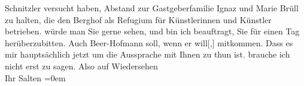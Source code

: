 \begin{ledgroupsized}[t]{13cm}
{{{                  Schnitzler versucht haben, Abstand zur Gastgeberfamilie Ignaz und Marie Brüll zu halten, die den Berghof als Refugium für Künstlerinnen und Künstler
                  betrieben.}}}\label{K_L03114-2h} würde man Sie gerne sehen, und bin ich beauftragt,
               Sie für einen Tag herüberzubitten. Auch Beer-Hofmann soll, wenn er will{[},{]} mitkommen. Dass es mir
               hauptsächlich jetzt um die Aussprache mit Ihnen zu thun ist\textcolor{gray}{,}
               brauche ich nicht erst zu sagen.\pend
           \pstart
           Also auf Wiedersehen {\\[\baselineskip]}Ihr \spacefill\mbox{Salten}\pend
           \leftskip=0em{}
         
         \endnumbering{}\end{ledgroupsized}  \newcommand{\dateiname}{L03114}\newcommand{\titel}{Felix Salten an Arthur Schnitzler, [25.? 8. 1892]}\newcommand{\editorInnen}{Martin Anton Müller und Laura Untner}
      